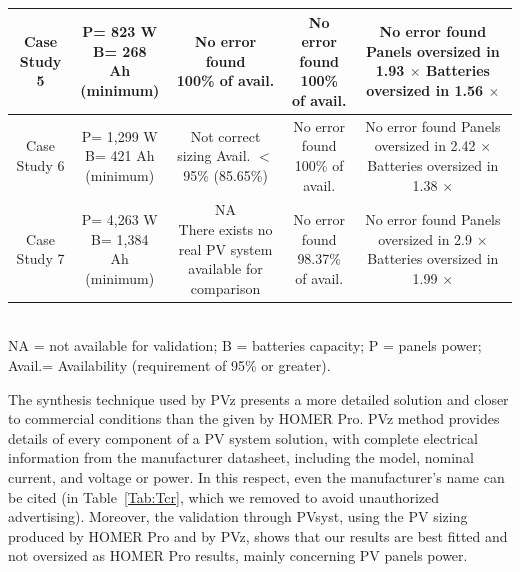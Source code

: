 \documentclass[a4paper,donotrepeattitle,fleqn]{cas-dc}
\begin{document}
\begin{table}
\begin{scriptsize}
\begin{tabular}{c|c|c|c|c}
\hline
Case Study 5 & \makecell{P= 823 W\\B= 268 Ah\\(minimum)} & \makecell{No error found \\100\% of avail.} & \makecell{No error found \\100\% of avail.} & \makecell{No error found\\Panels oversized in 1.93 $\times$\\Batteries oversized in 1.56 $\times$}\\
\hline
Case Study 6 & \makecell{P= 1,299 W\\B= 421 Ah\\(minimum)} & \makecell{Not correct sizing \\Avail. $<$ 95\%\\(85.65\%)} & \makecell{No error found \\100\% of avail.} & \makecell{No error found\\Panels oversized in 2.42 $\times$\\Batteries oversized in 1.38 $\times$}\\
\hline
Case Study 7 & \makecell{P= 4,263 W\\B= 1,384 Ah\\(minimum)} & \makecell{NA\\There exists no real PV system\\available for comparison} & \makecell{No error found \\98.37\% of avail.} & \makecell{No error found\\Panels oversized in 2.9 $\times$\\Batteries oversized in 1.99 $\times$}\\
\hline
\hline
\end{tabular}
\\NA = not available for validation; B = batteries capacity; P = panels power; Avail.= Availability (requirement of 95\% or greater).
\end{scriptsize}
\end{table}

The synthesis technique used by PVz presents a more detailed solution and closer to commercial conditions than the given by HOMER Pro. PVz method provides details of every component of a PV system solution, with complete electrical information from the manufacturer datasheet, including the model, nominal current, and voltage or power. In this respect, even the manufacturer's name can be cited (in Table~\ref{Tab:Tcr}, which we removed to avoid unauthorized advertising). Moreover, the validation through PVsyst, using the PV sizing produced by HOMER Pro and by PVz, shows that our results are best fitted and not oversized as HOMER Pro results, mainly concerning PV panels power.
\end{document}
